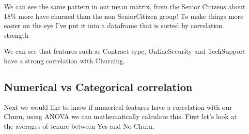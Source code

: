 \documentclass[letterpaper,10pt,english]{jupyterBook}
\begin{document}
\sphinxAtStartPar
We can see the same pattern in our mean matrix, from the Senior Citizens about 18\% more have churned than the non SeniorCitizen group! To make things more easier on the eye I’ve put it into a dataframe that is sorted by correlation strength

\begin{sphinxVerbatim}[commandchars=\\\{\}]
  
         \PYG{p}{[}\PYG{p}{[}\PYG{p}{]}\PYG{p}{[}\PYG{p}{]}    \PYG{p}{]}
         \PYG{p}{[}\PYG{p}{[}\PYG{p}{]}\PYG{p}{[}\PYG{p}{]}    \PYG{p}{]}
      
\end{sphinxVerbatim}

\sphinxAtStartPar
We can see that features such as Contract type, OnlineSecurity and TechSupport have a strong correlation with Churning.


\subsection{Numerical vs Categorical correlation}
\label{\detokenize{c7_case_studies/Churn:numerical-vs-categorical-correlation}}
\sphinxAtStartPar
Next we would like to know if numerical features have a correlation with our Churn, using ANOVA we can mathematically calculate this. First let’s look at the averages of tenure between Yes and No Churn.

\begin{sphinxVerbatim}[commandchars=\\\{\}]
\end{sphinxVerbatim}
\end{document}
